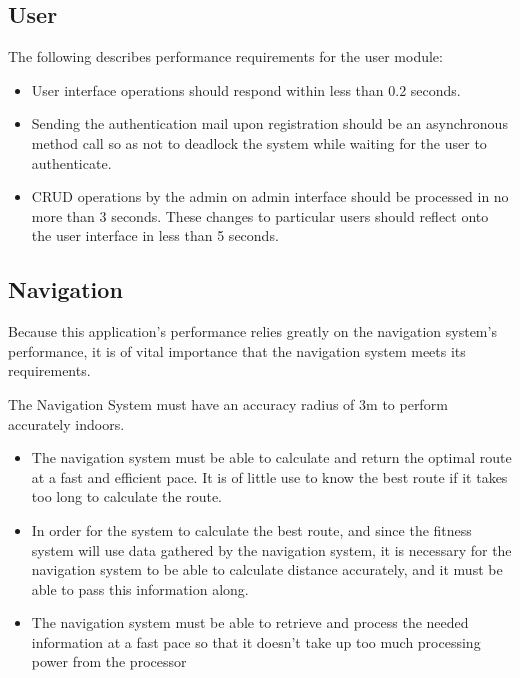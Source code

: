 \documentclass[runningheads,a4paper]{article}
\begin{document}
\subsection{User}

The following describes performance requirements for the user module: 

\begin{itemize}
\item User interface operations should respond within less than 0.2 seconds.

\item Sending the authentication mail upon registration should be an asynchronous method call so as not to deadlock the system while waiting for the user to authenticate. 

\item CRUD operations by the admin on admin interface should be processed in no more than 3 seconds. These changes to particular users should reflect onto the user interface in less than 5 seconds.
\end{itemize}

\subsection{Navigation}
Because this application’s performance relies greatly on the navigation system’s performance, it is of vital importance that the navigation system meets its requirements. 


The Navigation System must have an accuracy radius of 3m to perform accurately indoors.
\begin{itemize}


\item The navigation system must be able to calculate and return the optimal route at a fast and efficient pace. It is of little use to know the best route if it takes too long to calculate the route.

\item In order for the system to calculate the best route, and since the fitness system will use data gathered by the navigation system, it is necessary for the navigation system to be able to calculate distance accurately, and it must be able to pass this information along.

\item The navigation system must be able to retrieve and process the needed information at a fast pace so that it doesn’t take up too much processing power from the processor
\end{itemize}
\end{document}
